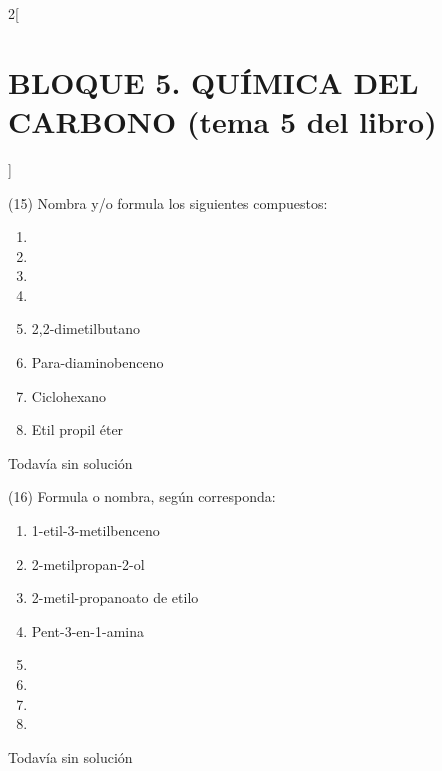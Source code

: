\documentclass[10pt]{article}
\begin{document}
\begin{multicols}{2}[
  \section{BLOQUE 5. QUÍMICA DEL CARBONO (tema 5 del libro)}
  ]
\begin{exercise}[
    tags    = {},
    topics  = {química, química orgánica, orgánica},
    source  = {FQ 1B MGH 2016, p151, e15},
  ]
  (15) Nombra y/o formula los siguientes compuestos:
  \begin{enumerate}
    \item {}
    \item {}
    \item {}
    \item {}
    \item 2,2-dimetilbutano
    \item Para-diaminobenceno
    \item Ciclohexano
    \item Etil propil éter
  \end{enumerate}
\end{exercise}

\begin{solution}[print=false]
  Todavía sin solución
\end{solution}




\begin{exercise}[
    tags    = {},
    topics  = {química, química orgánica, orgánica},
    source  = {FQ 1B MGH 2016, p151, e16},
  ]
  (16) Formula o nombra, según corresponda:
  \begin{enumerate}
    \item 1-etil-3-metilbenceno
    \item 2-metilpropan-2-ol
    \item 2-metil-propanoato de etilo
    \item Pent-3-en-1-amina
    \item {}
    \item {}
    \item {}
    \item {}
  \end{enumerate}
\end{exercise}

\begin{solution}[print=false]
  Todavía sin solución
\end{solution}





\end{multicols}
\end{document}
